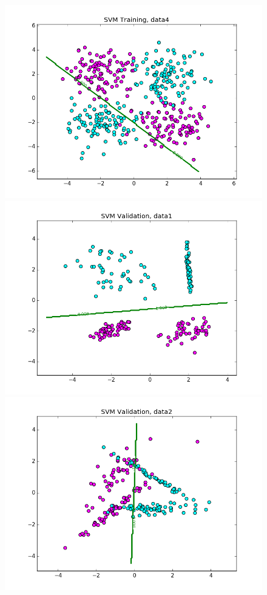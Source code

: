 \documentclass{article}
\begin{document}
\begin{figure}[width=\linewidth]
\begin{multicols}{2}
  \includegraphics[width=1.2\linewidth]{code/P2/data4,training.png}
  \includegraphics[width=1.2\linewidth]{code/P2/data1,validation.png}
  \includegraphics[width=1.2\linewidth]{code/P2/data2,validation.png}

\end{multicols}
\end{figure}
\end{document}

